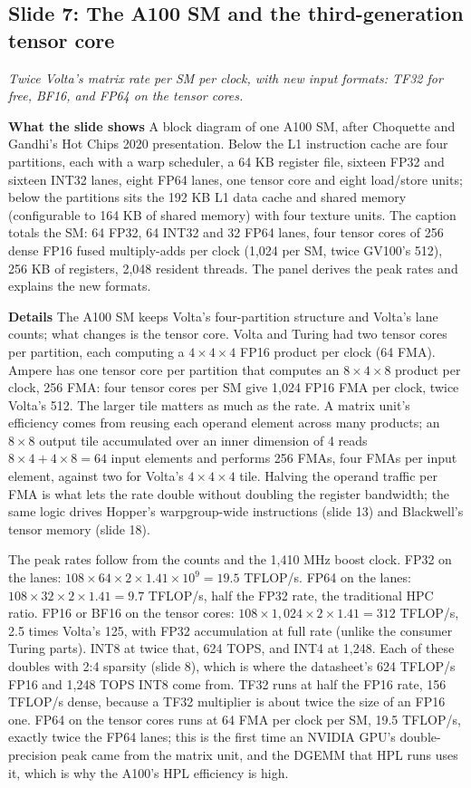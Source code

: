 \documentclass[11pt,letterpaper]{article}
\newcommand{\slide}[3]{%
  \subsection[Slide #1: #2]{Slide #1: #2}%
  {\color{muted}\itshape #3\par}\medskip}
\newcommand{\para}[1]{\medskip\noindent\textbf{#1}\quad}
\begin{document}
\slide{7}{The A100 SM and the third-generation tensor core}{Twice Volta's matrix rate per SM per clock, with new input formats: TF32 for free, BF16, and FP64 on the tensor cores.}

\para{What the slide shows} A block diagram of one A100 SM, after Choquette and Gandhi's Hot Chips 2020 presentation. Below the L1 instruction cache are four partitions, each with a warp scheduler, a 64 KB register file, sixteen FP32 and sixteen INT32 lanes, eight FP64 lanes, one tensor core and eight load/store units; below the partitions sits the 192 KB L1 data cache and shared memory (configurable to 164 KB of shared memory) with four texture units. The caption totals the SM: 64 FP32, 64 INT32 and 32 FP64 lanes, four tensor cores of 256 dense FP16 fused multiply-adds per clock (1,024 per SM, twice GV100's 512), 256 KB of registers, 2,048 resident threads. The panel derives the peak rates and explains the new formats.

\para{Details} The A100 SM keeps Volta's four-partition structure and Volta's lane counts; what changes is the tensor core. Volta and Turing had two tensor cores per partition, each computing a $4\times4\times4$ FP16 product per clock (64 FMA). Ampere has one tensor core per partition that computes an $8\times4\times8$ product per clock, 256 FMA: four tensor cores per SM give 1,024 FP16 FMA per clock, twice Volta's 512. The larger tile matters as much as the rate. A matrix unit's efficiency comes from reusing each operand element across many products; an $8\times8$ output tile accumulated over an inner dimension of 4 reads $8\times4 + 4\times8 = 64$ input elements and performs 256 FMAs, four FMAs per input element, against two for Volta's $4\times4\times4$ tile. Halving the operand traffic per FMA is what lets the rate double without doubling the register bandwidth; the same logic drives Hopper's warpgroup-wide instructions (slide 13) and Blackwell's tensor memory (slide 18).

The peak rates follow from the counts and the 1,410 MHz boost clock. FP32 on the lanes: $108 \times 64 \times 2 \times 1.41 \times 10^9 = 19.5$ TFLOP/s. FP64 on the lanes: $108 \times 32 \times 2 \times 1.41 = 9.7$ TFLOP/s, half the FP32 rate, the traditional HPC ratio. FP16 or BF16 on the tensor cores: $108 \times 1{,}024 \times 2 \times 1.41 = 312$ TFLOP/s, 2.5 times Volta's 125, with FP32 accumulation at full rate (unlike the consumer Turing parts). INT8 at twice that, 624 TOPS, and INT4 at 1,248. Each of these doubles with 2:4 sparsity (slide 8), which is where the datasheet's 624 TFLOP/s FP16 and 1,248 TOPS INT8 come from. TF32 runs at half the FP16 rate, 156 TFLOP/s dense, because a TF32 multiplier is about twice the size of an FP16 one. FP64 on the tensor cores runs at 64 FMA per clock per SM, 19.5 TFLOP/s, exactly twice the FP64 lanes; this is the first time an NVIDIA GPU's double-precision peak came from the matrix unit, and the DGEMM that HPL runs uses it, which is why the A100's HPL efficiency is high.
\end{document}
